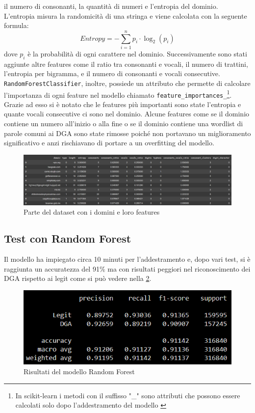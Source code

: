 \documentclass[12pt,a4paper,openright,twoside]{book}
\begin{document}
il numero di consonanti, la quantità di numeri e l'entropia del dominio.
L'entropia misura la randomicità di una stringa e viene calcolata con la seguente formula:
\begin{equation}
    Entropy = -\sum_{i=1}^{n} p_i \cdot \log_2(p_i)
\end{equation}
dove $p_i$ è la probabilità di ogni carattere nel dominio. \hfil \break
Successivamente sono stati aggiunte altre features come il ratio tra consonanti e vocali,
il numero di trattini, l'entropia per bigramma, e il numero di consonanti e vocali consecutive.
\texttt{RandomForestClassifier}, inoltre, possiede un attributo che permette di calcolare l'importanza di ogni feature nel modello
chiamato \texttt{feature\_importances\_}\footnote{In scikit-learn i metodi con il suffisso "\_" sono attributi che possono essere calcolati solo dopo l'addestramento del modello \cite{scikit_learn_underscore}}.
Grazie ad esso si è notato che le features più importanti sono state
l'entropia e quante vocali consecutive ci sono nel dominio.
Alcune features come se il dominio contiene un numero all'inizio o alla fine
o se il dominio contiene una wordlist di parole comuni ai DGA sono state
rimosse poiché non portavano un miglioramento significativo e anzi 
rischiavano di portare a un overfitting del modello.
\begin{figure}[H]
    \centering
    \includegraphics[width=.8\linewidth]{figures/RF_feature.png}
    \caption{Parte del dataset con i domini e loro features}
    \label{fig:RF feature}
\end{figure}

\subsection{Test con Random Forest}
Il modello ha impiegato circa 10 minuti per l'addestramento e, dopo vari test,
si è raggiunta un accuratezza del 91\% ma
con risultati peggiori nel riconoscimento dei DGA rispetto ai legit come si può vedere nella \cref{fig:RF results}.

\begin{figure}[H]
    \centering
    \includegraphics[width=.8\linewidth]{figures/RF_results.png}
    \caption{Risultati del modello Random Forest}
    \label{fig:RF results}
\end{figure}
\end{document}
